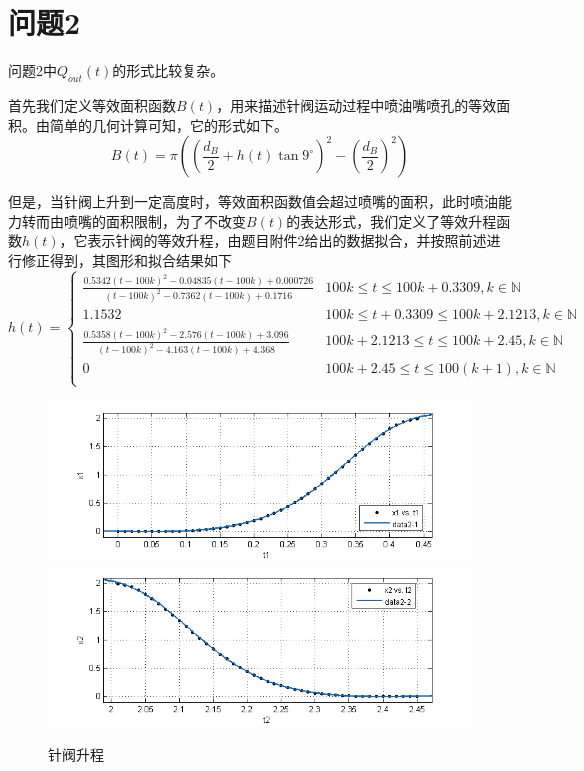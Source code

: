 \documentclass[12pt,AutoFakeBold]{article}%
\begin{document}
    \section{问题2}
    问题2中$Q_{out}(t)$的形式比较复杂。\par
    首先我们定义等效面积函数$B(t)$，用来描述针阀运动过程中喷油嘴喷孔的等效面积。由简单的几何计算可知，它的形式如下。
    \begin{equation}
        B(t)=\pi\left(\left(\frac{d_B}{2}+h(t)\tan9^\circ\right)^2-\left(\frac{d_B}{2}\right)^2\right)
    \end{equation}\par
    但是，当针阀上升到一定高度时，等效面积函数值会超过喷嘴的面积，此时喷油能力转而由喷嘴的面积限制，为了不改变$B(t)$的表达形式，我们定义了等效升程函数$h(t)$，它表示针阀的等效升程，由题目附件2给出的数据拟合，并按照前述进行修正得到，其图形和拟合结果如下
    \begin{equation}
        h(t)=
        \begin{cases}
            \frac{0.5342(t-100k)^2-0.04835(t-100k)+0.000726}{(t-100k)^2-0.7362(t-100k)+0.1716}&100k\leq t\leq 100k+0.3309,k\in\mathbb{N}\\
            1.1532&100k\leq t+0.3309\leq 100k+2.1213,k\in\mathbb{N}\\
            \frac{0.5358(t-100k)^2-2.576(t-100k)+3.096}{(t-100k)^2-4.163(t-100k)+4.368}&100k+2.1213\leq t\leq 100k+2.45,k\in\mathbb{N}\\
            0&100k+2.45\leq t\leq 100(k+1),k\in\mathbb{N}\\      
        \end{cases}
    \end{equation}
    \begin{figure}[H]
        \centering
        \includegraphics[scale=0.8]{figure/data21.png}
        \includegraphics[scale=0.8]{figure/data22.png}
        \caption{针阀升程}
        \label{zhenfa}
    \end{figure}
\end{document}
